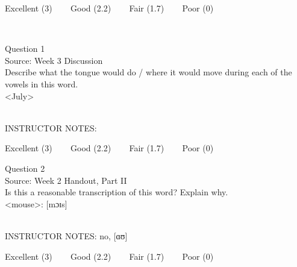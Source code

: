 \documentclass[12pt]{article}
\begin{document}
\vfill
Excellent (3) ~~~ Good (2.2) ~~~ Fair (1.7) ~~~ Poor (0)
\newpage

\begin{center}
\textbf{{\color{red}{\HUGE END OF EXAM}}}\\

\end{center}
\newpage

\begin{center}
\textbf{{\color{blue}{\HUGE START OF EXAM\\}}}

\textbf{{\color{blue}{\HUGE Student ID: 78380\\}}}

\textbf{{\color{blue}{\HUGE 4:20\\}}}

\end{center}
\newpage

{\large Question 1}\\

Source: Week 3 Discussion\\

Describe what the tongue would do / where it would move during each of the vowels in this word.\\

<July>


~\\
INSTRUCTOR NOTES: 


\vfill
Excellent (3) ~~~ Good (2.2) ~~~ Fair (1.7) ~~~ Poor (0)
\newpage

{\large Question 2}\\

Source: Week 2 Handout, Part II\\

Is this a reasonable transcription of this word? Explain why.\\

<mouse>: {[mɔɪs]}


~\\
INSTRUCTOR NOTES: no, [ɑʊ]


\vfill
Excellent (3) ~~~ Good (2.2) ~~~ Fair (1.7) ~~~ Poor (0)
\newpage

\begin{center}
\textbf{{\color{red}{\HUGE END OF EXAM}}}\\

\end{center}
\newpage

\begin{center}
\textbf{{\color{blue}{\HUGE START OF EXAM\\}}}

\textbf{{\color{blue}{\HUGE Student ID: 68382\\}}}

\textbf{{\color{blue}{\HUGE 4:30\\}}}

\end{center}
\newpage
\end{document}
